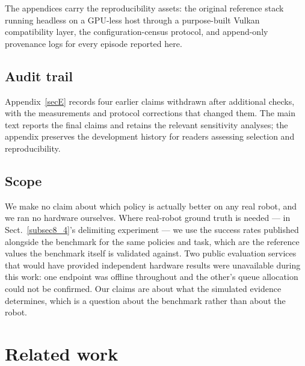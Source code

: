 \documentclass[pdflatex,iicol,sn-apa]{sn-jnl}
\theoremstyle{remark}
\begin{document}
\noindent The appendices carry the reproducibility assets: the original reference stack running
headless on a GPU-less host through a purpose-built Vulkan compatibility layer, the
configuration-census protocol, and append-only provenance logs for every episode reported here.

\subsection{Audit trail}\label{subsec1_2}

Appendix~\ref{secE} records four earlier claims withdrawn after additional checks, with the
measurements and protocol corrections that changed them. The main text reports the final claims
and retains the relevant sensitivity analyses; the appendix preserves the development history for
readers assessing selection and reproducibility.

\subsection{Scope}\label{subsec1_3}

We make no claim about which policy is actually better on any real robot, and we ran no hardware
ourselves. Where real-robot ground truth is needed --- in Sect.~\ref{subsec8_4}'s delimiting
experiment --- we use the success rates published alongside the benchmark for the same policies and
task, which are the reference values the benchmark itself is validated against. Two public
evaluation services that would have provided independent hardware results were unavailable during
this work: one endpoint was offline throughout and the other's queue allocation could not be
confirmed. Our claims are about what the simulated evidence determines, which is a question about
the benchmark rather than about the robot.

\section{Related work}\label{sec2}
\end{document}
